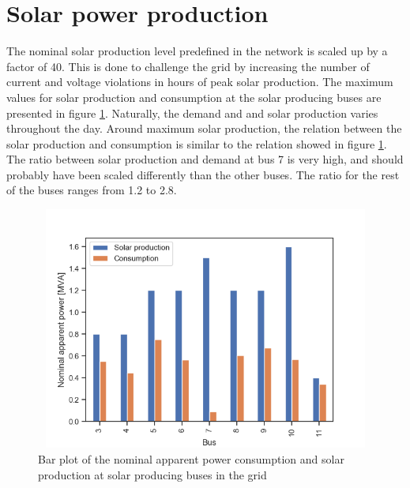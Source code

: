 \documentclass[class=book, crop=false]{standalone}
\begin{document}
\section{Solar power production}
The nominal solar production level predefined in the network is scaled up by a factor of 40. This is done to challenge the grid by increasing the number of current and voltage violations in hours of peak solar production. The maximum values for solar production and consumption at the solar producing buses are presented in figure \ref{fig:discussion:nominal_sgen}. Naturally, the demand and and solar production varies throughout the day. Around maximum solar production, the relation between the solar production and consumption is similar to the relation showed in figure \ref{fig:discussion:nominal_sgen}. The ratio between solar production and demand at bus 7 is very high, and should probably have been scaled differently than the other buses. The ratio for the rest of the buses ranges from 1.2 to 2.8. 

\begin{figure}[h]
    \center
\includegraphics[height=8cm, width=12cm]{figures/nominal_sgen.png}
    \caption[size = 9]{Bar plot of the nominal apparent power consumption and solar production at solar producing buses in the grid}
    \label{fig:discussion:nominal_sgen}
\end{figure}
\end{document}
